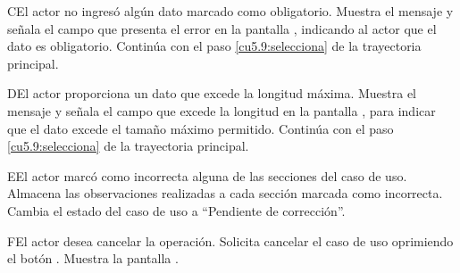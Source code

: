  \begin{UCtrayectoriaA}{C}{El actor no ingresó algún dato marcado como obligatorio.}
    \UCpaso[\UCsist] Muestra el mensaje  y señala el campo que presenta el error en la pantalla , indicando al actor que el dato es obligatorio.
    \UCpaso[] Continúa con el paso \ref{cu5.9:selecciona} de la trayectoria principal.
 \end{UCtrayectoriaA}
 
 \begin{UCtrayectoriaA}{D}{El actor proporciona un dato que excede la longitud máxima.}
    \UCpaso[\UCsist] Muestra el mensaje  y señala el campo que excede la 
    longitud en la pantalla , para indicar que el dato excede el tamaño máximo permitido.
    \UCpaso[] Continúa con el paso \ref{cu5.9:selecciona} de la trayectoria principal.
 \end{UCtrayectoriaA}
 
 \begin{UCtrayectoriaA}{E}{El actor marcó como incorrecta alguna de las secciones del caso de uso.}
    \UCpaso[\UCsist] Almacena las observaciones realizadas a cada sección marcada como incorrecta.
    \UCpaso[\UCsist] Cambia el estado del caso de uso a ``Pendiente de corrección''.
 \end{UCtrayectoriaA}
 
 \begin{UCtrayectoriaA}{F}{El actor desea cancelar la operación.}
    \UCpaso[\UCactor] Solicita cancelar el caso de uso oprimiendo el botón .
    \UCpaso[\UCsist] Muestra la pantalla .
 \end{UCtrayectoriaA}